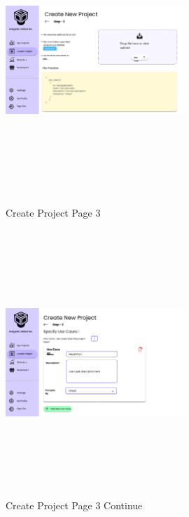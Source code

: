 \begin{figure}[H]
\includegraphics[height=10cm, width=0.6\textwidth]{./images/prototype/0014}
\centering 
\caption{Create Project Page 3}
\label{fig:prototype1}


\includegraphics[height=10cm, width=0.6\textwidth]{./images/prototype/0017}
\centering 
\caption{Create Project Page 3 Continue}
\label{fig:prototype1}
\end{figure}

